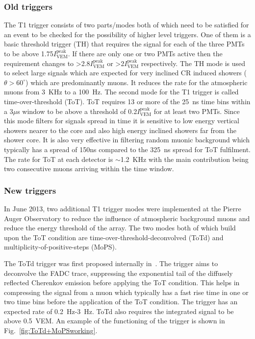 \subsubsection{Old triggers}
\label{sec:Sur_det_trig_old}
The T1 trigger consists of two parts/modes both of which need to be satisfied for an event to be checked for the possibility of higher level triggers. One of them is a basic threshold trigger (TH) that requires the signal for each of the three PMTs to be above 1.75$I_{\text{VEM}}^{\text{peak}}$. If there are only one or two PMTs active then the requirement changes to >2.8$I_{\text{VEM}}^{\text{peak}}$ or >2$I_{\text{VEM}}^{\text{peak}}$ respectively. The TH mode is used to select large signals which are expected for very inclined CR induced showers ($\theta >60^{\circ}$) which are predominantly muons. It reduces the rate for the atmospheric muons from 3 KHz to a 100 Hz. The second mode for the T1 trigger is called time-over-threshold (ToT). ToT requires 13 or more of the 25 ns time bins within a 3$\mu$s window to be above a threshold of 0.2$I_{\text{VEM}}^{\text{peak}}$ for at least two PMTs. Since this mode filters for signals spread in time it is sensitive to low energy vertical showers nearer to the core and also high energy inclined showers far from the shower core. It is also very effective in filtering random muonic background which typically has a spread of 150ns compared to the 325 ns spread for ToT fulfilment. The rate for ToT at each detector is $\sim$1.2 KHz with the main contribution being two consecutive muons arriving within the time window. 

\subsubsection{New triggers}
\label{sec:Sur_det_trig_new}
In June 2013, two additional T1 trigger modes were implemented at the Pierre Auger Observatory to reduce the influence of atmospheric background muons and reduce the energy threshold of the array. The two modes both of which build upon the ToT condition are time-over-threshold-deconvolved (ToTd) and multiplicity-of-positive-steps (MoPS).

The ToTd trigger was first proposed internally in~\cite{gap_note_2009}. The trigger aims to deconvolve the FADC trace, suppressing the exponential tail of the diffusely reflected Cherenkov emission before applying the ToT condition. This helps in compressing the signal from a muon which typically has a fast rise time in one or two time bins before the application of the ToT condition. The trigger has an expected rate of 0.2 Hz-3 Hz. ToTd also requires the integrated signal to be above 0.5 VEM. An example of the functioning of the trigger is shown in Fig.~\ref{fig:ToTd+MoPSworking}. 

